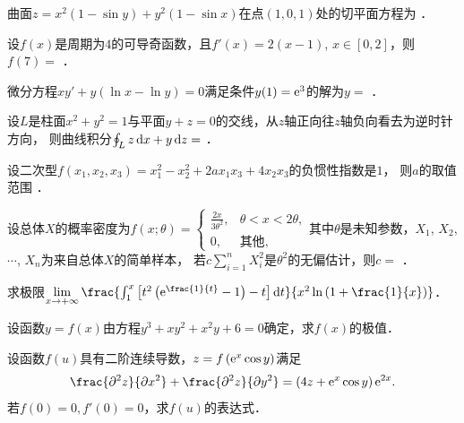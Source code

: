 \documentclass[plain,noanswer,medmath]{../../template/jnuexam}
\begin{document}


\begin{problem}
曲面$z = x^2(1 - \sin y) + y^2(1 - \sin x)$在点$(1,0,1)$处的切平面方程为 \fillin{}．
\end{problem}


\begin{problem}
设$f(x)$是周期为$4$的可导奇函数，且$f'(x)= 2(x - 1)$, $x \in[0,2]$，则$f(7) =$ \fillin{}．
\end{problem}


\begin{problem}
微分方程$xy' + y(\ln x - \ln y) = 0$满足条件$y(1) = \mathrm{e}^3$的解为$y =$ \fillin{}．
\end{problem}


\begin{problem}
设$L$是柱面$x^2 + y^2 = 1$与平面$y + z = 0$的交线，从$z$轴正向往$z$轴负向看去为逆时针方向，
则曲线积分$\oint_L z\mathop{}\!\mathrm{d} x + y\mathop{}\!\mathrm{d} z =$ \fillin{}．
\end{problem}


\begin{problem}
设二次型$f(x_1,x_2,x_3) = x_1^2 - x_2^2 + 2ax_1x_3 + 4x_2x_3$的负惯性指数是$1$，
则$a$的取值范围 \fillin{}．
\end{problem}


\begin{problem}
设总体$X$的概率密度为$f\left(x;\theta \right) = \begin{cases}
  \frac{2x}{3\theta^2}, & \theta < x < 2\theta , \\
                     0, & \text{其他},
\end{cases}$其中$\theta$是未知参数，$X_1$, $X_2$, $\cdots$, $X_n$为来自总体$X$的简单样本，
若$c\sum_{i = 1}^n X_i^2$是$\theta^2$的无偏估计，则$c =$ \fillin{}．
\end{problem}




\begin{problem}[points=10]
求极限$\lim_{x \to +\infty}
\frac{\int_1^x \left[t^2\left(\e^{\frac{1}{t}} - 1\right) - t \right]\dt}
     {x^2\ln \left(1 + \frac{1}{x}\right)}$．
\end{problem}


\begin{problem}[points=10]
设函数$y = f(x)$由方程$y^3 + xy^2 + x^2 y + 6 = 0$确定，求$f(x)$的极值．
\end{problem}


\begin{problem}[points=10]
设函数$f(u)$具有二阶连续导数，$z = f\left(\mathrm{e}^x\cos y \right)$满足
$$\frac{\pd^2 z}{\pd x^2} + \frac{\pd^2 z}{\pd y^2} = \left(4z + \e^x\cos y \right) \e^{2x}.$$
若$f(0) = 0,f'(0) = 0$，求$f(u)$的表达式．
\end{problem}
\end{document}
